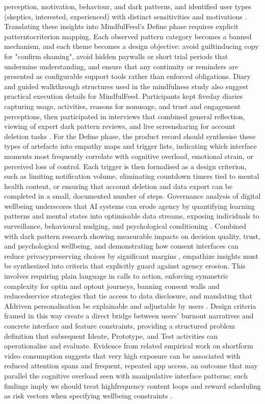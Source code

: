 \documentclass{article}
\begin{document}
perception, motivation, behaviour, and dark patterns, and identified user types (skeptics, interested, experienced) with distinct sensitivities and motivations \parencites[5]{7173856}. Translating these insights into MindfulFeed's Define phase requires explicit pattern\-to\-criterion mapping. Each observed pattern category becomes a banned mechanism, and each theme becomes a design objective: avoid guilt\-inducing copy for "confirm shaming", avoid hidden paywalls or short trial periods that undermine understanding, and ensure that any continuity or reminders are presented as configurable support tools rather than enforced obligations. Diary and guided walkthrough structures used in the mindfulness study also suggest practical execution details for MindfulFeed. Participants kept five\-day diaries capturing usage, activities, reasons for non\-usage, and trust and engagement perceptions, then participated in interviews that combined general reflection, viewing of expert dark pattern reviews, and live screen\-sharing for account deletion tasks \parencites[4]{7173856}. For the Define phase, the product record should synthesise these types of artefacts into empathy maps and trigger lists, indicating which interface moments most frequently correlate with cognitive overload, emotional strain, or perceived loss of control. Each trigger is then formalised as a design criterion, such as limiting notification volume, eliminating countdown timers tied to mental health content, or ensuring that account deletion and data export can be completed in a small, documented number of steps. Governance analysis of digital well\-being underscores that AI systems can erode agency by quantifying learning patterns and mental states into optimisable data streams, exposing individuals to surveillance, behavioural nudging, and psychological conditioning \parencites[3]{7808872}. Combined with dark pattern research showing measurable impacts on decision quality, trust, and psychological well\-being, and demonstrating how consent interfaces can reduce privacy\-preserving choices by significant margins \parencites[2]{4807303}, empathize insights must be synthesized into criteria that explicitly guard against agency erosion. This involves requiring plain language in calls to action, enforcing symmetric complexity for opt\-in and opt\-out journeys, banning consent walls and reduced\-service strategies that tie access to data disclosure, and mandating that AI\-driven personalisation be explainable and adjustable by users \parencites[15]{5678011}[8]{4807303}. Design criteria framed in this way create a direct bridge between users' burnout narratives and concrete interface and feature constraints, providing a structured problem definition that subsequent Ideate, Prototype, and Test activities can operationalise and evaluate. Evidence from related empirical work on short\-form video consumption suggests that very high exposure can be associated with reduced attention spans and frequent, repeated app access, an outcome that may parallel the cognitive overload seen with manipulative interface patterns; such findings imply we should treat high\-frequency content loops and reward scheduling as risk vectors when specifying well\-being constraints \parencites[10]{2464839}.
\end{document}
